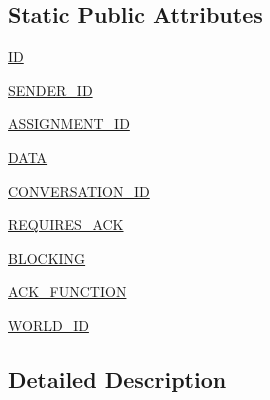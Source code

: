 \subsection*{Static Public Attributes}
\begin{DoxyCompactItemize}
\item 
\hyperlink{classparlai_1_1mturk_1_1core_1_1test_1_1test__socket__manager_1_1TestSocketManagerRoutingFunctionality_a79d63571dc2e37870e7d7690670714e6}{ID}
\item 
\hyperlink{classparlai_1_1mturk_1_1core_1_1test_1_1test__socket__manager_1_1TestSocketManagerRoutingFunctionality_ac1344fd0e7499cad6ef7c0723e2025bd}{S\+E\+N\+D\+E\+R\+\_\+\+ID}
\item 
\hyperlink{classparlai_1_1mturk_1_1core_1_1test_1_1test__socket__manager_1_1TestSocketManagerRoutingFunctionality_a6e61c0590c5d0ca22e35ef7b166f7ae3}{A\+S\+S\+I\+G\+N\+M\+E\+N\+T\+\_\+\+ID}
\item 
\hyperlink{classparlai_1_1mturk_1_1core_1_1test_1_1test__socket__manager_1_1TestSocketManagerRoutingFunctionality_ad2afc4b2a1f5487bc6e7df6be5312cef}{D\+A\+TA}
\item 
\hyperlink{classparlai_1_1mturk_1_1core_1_1test_1_1test__socket__manager_1_1TestSocketManagerRoutingFunctionality_a2c8366bd4fa4614dc0f01deb4afc4965}{C\+O\+N\+V\+E\+R\+S\+A\+T\+I\+O\+N\+\_\+\+ID}
\item 
\hyperlink{classparlai_1_1mturk_1_1core_1_1test_1_1test__socket__manager_1_1TestSocketManagerRoutingFunctionality_a9fc2deea13e0c30cd6d6d12de6607c0b}{R\+E\+Q\+U\+I\+R\+E\+S\+\_\+\+A\+CK}
\item 
\hyperlink{classparlai_1_1mturk_1_1core_1_1test_1_1test__socket__manager_1_1TestSocketManagerRoutingFunctionality_a28a8f505763032f27356e92c3e9b990c}{B\+L\+O\+C\+K\+I\+NG}
\item 
\hyperlink{classparlai_1_1mturk_1_1core_1_1test_1_1test__socket__manager_1_1TestSocketManagerRoutingFunctionality_a604b7aa2981b1f2174926216879f027e}{A\+C\+K\+\_\+\+F\+U\+N\+C\+T\+I\+ON}
\item 
\hyperlink{classparlai_1_1mturk_1_1core_1_1test_1_1test__socket__manager_1_1TestSocketManagerRoutingFunctionality_ab4ed49704792ebd79a97f88cbe61b51a}{W\+O\+R\+L\+D\+\_\+\+ID}
\end{DoxyCompactItemize}


\subsection{Detailed Description}


